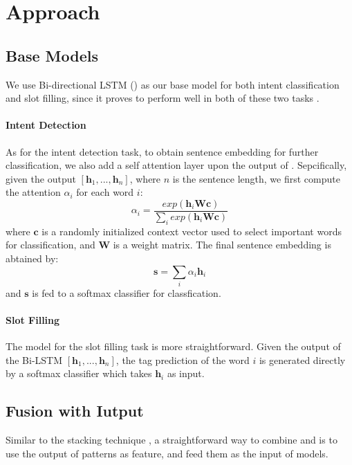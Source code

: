\section{Approach}
\subsection{Base Models}
We use Bi-directional LSTM (\BLSTM) as our base \NN model for both intent classification and slot filling, since it proves to perform well in both of these two tasks \cite{liu2016attention}. 
\paragraph{Intent Detection}
As for the intent detection task, to obtain sentence embedding for further classification, we also add a self attention layer upon the output of \BLSTM. Sepcifically, given the \BLSTM output $[\textbf{h}_1, ..., \textbf{h}_n]$, where $n$ is the sentence length, we first compute the attention $\alpha_i$ for each word $i$:
\begin{equation}
\alpha_i=\frac{exp(\textbf{h}_i\textbf{Wc})}{\sum_{i}{exp(\textbf{h}_i\textbf{Wc})}}
\end{equation}
where $\textbf{c}$ is a randomly initialized context vector used to select important words for classification, and $\textbf{W}$ is a weight matrix. The final sentence embedding is abtained by: 
\begin{equation}
\textbf{s} = \sum_{i}{\alpha_i\textbf{h}_i}
\end{equation}
and $\textbf{s}$ is fed to a softmax classifier for classfication.

\paragraph{Slot Filling}
The model for the slot filling task is more straightforward. Given the output of the Bi-LSTM $[\textbf{h}_1, ..., \textbf{h}_n]$, the tag prediction of the word $i$ is generated directly by a softmax classifier which takes $\textbf{h}_i$ as input.


\subsection{Fusion with Iutput}
\label{fusion_with_input}
Similar to the stacking technique \cite{wolpert1992stacked}, a straightforward way to combine \RE and \NN is to use the output of \RE patterns as feature, and feed them as the input of \NN models.
